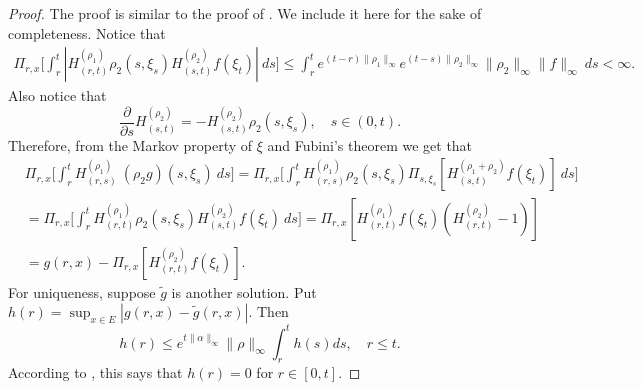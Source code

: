 \documentclass[12pt,a4paper]{amsart}
\theoremstyle{plain}
\theoremstyle{definition}
\numberwithin{equation}{section}
\begin{document}
\begin{proof}
    The proof is similar to the proof of \cite[Lemma A.1.5]{Dynkin1993Superprocesses}. We include it here for the sake of completeness.
    Notice that
\begin{equation}\begin{split}
   \Pi_{r,x} \Big[ \int_r^t | H_{(r,t)}^{(\rho_1)}\rho_2(s,\xi_s) H_{(s,t)}^{(\rho_2)} f(\xi_t)| ~ds \Big]
    \leq  \int_r^t e^{(t-r)\|\rho_1\|_\infty}e^{(t-s)\|\rho_2\|_\infty}\|\rho_2\|_\infty\|f\|_\infty ~ds
    < \infty.
\end{split}\end{equation}
    Also notice that
\begin{equation}
\label{eq: crucial for Feynman-Kac}
    \frac{\partial}{\partial s} H^{(\rho_2)}_{(s,t)}= -H^{(\rho_2)}_{(s,t)}\rho_2(s,\xi_s),
    \quad s\in (0,t).
\end{equation}
    Therefore, from the Markov property of $\xi$ and Fubini's theorem we get that
\begin{equation}\begin{split}
    &\Pi_{r,x} \Big[ \int_r^tH_{(r,s)}^{(\rho_1)}~(\rho_2 g)(s,\xi_s)~ds \Big]
    =\Pi_{r,x} \Big[ \int_r^t H_{(r,s)}^{(\rho_1)}\rho_2(s,\xi_s) \Pi_{s,\xi_s}[ H_{(s,t)}^{(\rho_1+\rho_2)} f(\xi_t)]~ds \Big]
    \\&= \Pi_{r,x} \Big[ \int_r^t H_{(r,t)}^{(\rho_1)}\rho_2(s,\xi_s) H_{(s,t)}^{(\rho_2)} f(\xi_t) ~ds \Big]
    = \Pi_{r,x} [ H_{(r,t)}^{(\rho_1)}f(\xi_t)(H_{(r,t)}^{(\rho_2)} - 1)]
    \\&= g(r,x) - \Pi_{r,x} [ H_{(r,t)}^{(\rho_2)} f(\xi_t)].
\end{split}\end{equation}
    For uniqueness, suppose  $\tilde g$ is another solution. Put $h(r) = \sup_{x\in E}|g(r,x) - \tilde g(r,x)|$. Then 
\[
    h(r) \leq e^{t\|\alpha\|_\infty}\|\rho\|_\infty \int_r^t h(s)ds,
    \quad r\le t.
\]
    According to \cite[Lemma A.1.5]{Dynkin1993Superprocesses}, this says that $h(r) =  0$ for $r\in [0,t]$.
\end{proof}
\end{document}
